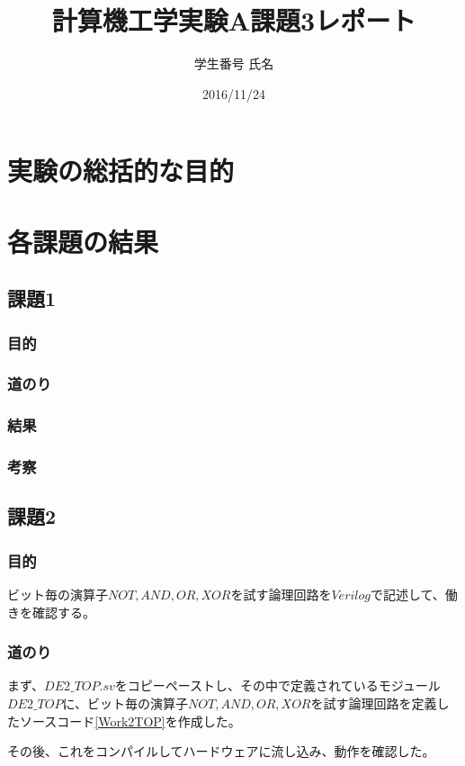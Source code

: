 \documentclass[a4paper]{jarticle}
\title{計算機工学実験A課題3レポート}
\author{学生番号 氏名}
\date{2016/11/24}
\begin{document}
\maketitle
\section{実験の総括的な目的}
\section{各課題の結果}
\subsection{課題1}
\subsubsection{目的}
\subsubsection{道のり}
\subsubsection{結果}
\subsubsection{考察}
\subsection{課題2}
\subsubsection{目的}
ビット毎の演算子$NOT,AND,OR,XOR$を試す論理回路を$Verilog$で記述して、働きを確認する。
\subsubsection{道のり}
まず、$DE2\_TOP.sv$をコピーペーストし、その中で定義されているモジュール$DE2\_TOP$に、ビット毎の演算子$NOT,AND,OR,XOR$を試す論理回路を定義したソースコード\ref{Work2TOP}を作成した。

その後、これをコンパイルしてハードウェアに流し込み、動作を確認した。
\end{document}
